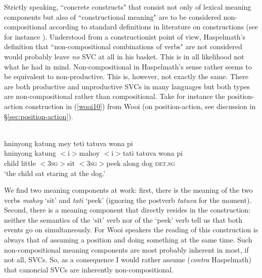 Strictly speaking, ``concrete constructs" that consist not only of lexical meaning components but also of ``constructional meaning" are to be considered non-compositional according to standard definitions in literature on constructions (see for instance \citealt{goldberg1995constructions, goldberg2006constructions, croft2001radical}). Understood from a constructionist point of view, Haspelmath's definition that ``non-compositional combinations of verbs" are not considered would probably leave \emph{no} SVC at all in his basket. This is in all likelihood not what he had in mind. Non-compositional in Haspelmath's sense rather seems to be equivalent to non-productive. This is, however, not exactly the same. There are both productive and unproductive SVCs in many languages but both types are non-compositional rather than compositional. Take for instance the position-action construction in (\ref{wooi10}) from Wooi (on position-action, see discussion in §\ref{sec:position-action}).

\ea \label{wooi10}
\\
\glll hninyong katung mey teti tatuva wona pi \\
hninyong katung $<$i$>$mahoy $<$i$>$tati tatuva wona pi \\
 child little $<$\textsc{3}\textsc{sg}$>$sit $<$\textsc{3}\textsc{sg}$>$peek along dog \textsc{det}.\textsc{sg} \\
\glft `the child sat staring at the dog.'\\ 
\z

We find two meaning components at work: first, there is the meaning of the two verbs \textit{mahoy} `sit' and \textit{tati} `peek' (ignoring the postverb \textit{tatuva} for the moment). Second, there is a meaning component that directly resides in the construction: neither the semantics of the `sit' verb nor of the `peek' verb tell us that both events go on simultaneously. For Wooi speakers the reading of this construction is always that of assuming a position and doing something at the same time. Such non-compositional meaning components are most probably inherent in most, if not all, SVCs. So, as a consequence I would rather assume (\textit{contra} Haspelmath) that canoncial SVCs are inherently non-compositional.


